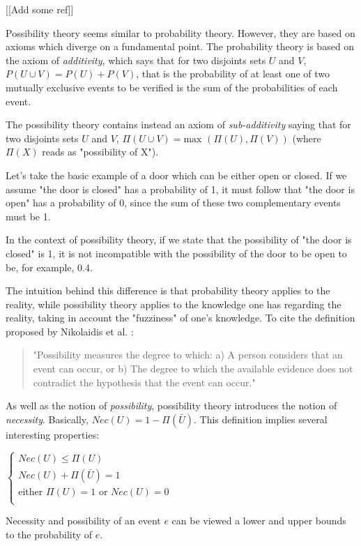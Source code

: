 [[Add some ref]]

Possibility theory seems similar to probability theory. However, they are based on axioms which diverge on a fundamental point.
The probability theory is based on the axiom of \emph{additivity}, which says that for two disjoints sets $U$ and $V$, $P(U \cup V) = P(U)+ P(V)$, that is the probability of at least one of two mutually exclusive events to be verified is the sum of the probabilities of each event.

The possibility theory contains instead an axiom of \emph{sub-additivity} saying that for two disjoints sets $U$ and $V$, $\Pi(U \cup V) = \text{max }(\Pi(U), \Pi(V))$ (where $\Pi(X)$ reads as "possibility of X").

Let's take the basic example of a door which can be either open or closed. If we assume "the door is closed" has a probability of 1, it must follow that "the door is open" has a probability of 0, since the sum of these two complementary events must be 1.

In the context of possibility theory, if we state that the possibility of "the door is closed" is 1, it is not incompatible with the possibility of the door to be open to be, for example, 0.4.

The intuition behind this difference is that probability theory applies to the reality, while possibility theory applies to the knowledge one has regarding the reality, taking in account the "fuzziness" of one's knowledge. To cite the definition proposed by Nikolaidis et al. \cite{nikolaidis:386}:
\begin{quote}
"Possibility measures the degree to which: a) A person considers that an event can
occur, or b) The degree to which the available evidence does not contradict the
hypothesis that the event can occur."
\end{quote}

As well as the notion of \emph{possibility}, possibility theory introduces the notion of \emph{necessity}. Basically, $Nec(U) = 1 - \Pi(\bar{U})$.
This definition implies several interesting properties:

$\left\{
\begin{array}{l}
Nec(U) \leq \Pi(U)\\
Nec(U) + \Pi(\bar{U}) = 1\\
\text{either } \Pi(U) = 1 \text{ or } Nec(U) = 0\\
\end{array}
\right.$

Necessity and possibility of an event $e$ can be viewed a lower and upper bounds to the probability of $e$.

